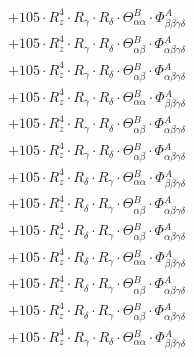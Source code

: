 \documentclass{article}
\begin{document}
\begin{subequations}
\begin{gather}
\begin{array}{c}
 \\[0.2em] 		 + 105 \cdot R_{z}^{4} \cdot R_{\gamma{}} \cdot R_{\delta{}} \cdot \Theta{}^{B}_{\alpha{}\alpha{}} \cdot \Phi{}^{A}_{\beta{}\beta{}\gamma{}\delta{}} 
 \\[0.2em] 		 + 105 \cdot R_{z}^{4} \cdot R_{\gamma{}} \cdot R_{\delta{}} \cdot \Theta{}^{B}_{\alpha{}\beta{}} \cdot \Phi{}^{A}_{\alpha{}\beta{}\gamma{}\delta{}} 
 \\[0.2em] 		 + 105 \cdot R_{z}^{4} \cdot R_{\gamma{}} \cdot R_{\delta{}} \cdot \Theta{}^{B}_{\alpha{}\beta{}} \cdot \Phi{}^{A}_{\alpha{}\beta{}\gamma{}\delta{}} 
 \\[0.2em] 		 + 105 \cdot R_{z}^{4} \cdot R_{\gamma{}} \cdot R_{\delta{}} \cdot \Theta{}^{B}_{\alpha{}\alpha{}} \cdot \Phi{}^{A}_{\beta{}\beta{}\gamma{}\delta{}} 
 \\[0.2em] 		 + 105 \cdot R_{z}^{4} \cdot R_{\gamma{}} \cdot R_{\delta{}} \cdot \Theta{}^{B}_{\alpha{}\beta{}} \cdot \Phi{}^{A}_{\alpha{}\beta{}\gamma{}\delta{}} 
 \\[0.2em] 		 + 105 \cdot R_{z}^{4} \cdot R_{\gamma{}} \cdot R_{\delta{}} \cdot \Theta{}^{B}_{\alpha{}\beta{}} \cdot \Phi{}^{A}_{\alpha{}\beta{}\gamma{}\delta{}} 
 \\[0.2em] 		 + 105 \cdot R_{z}^{4} \cdot R_{\delta{}} \cdot R_{\gamma{}} \cdot \Theta{}^{B}_{\alpha{}\alpha{}} \cdot \Phi{}^{A}_{\beta{}\beta{}\gamma{}\delta{}} 
 \\[0.2em] 		 + 105 \cdot R_{z}^{4} \cdot R_{\delta{}} \cdot R_{\gamma{}} \cdot \Theta{}^{B}_{\alpha{}\beta{}} \cdot \Phi{}^{A}_{\alpha{}\beta{}\gamma{}\delta{}} 
 \\[0.2em] 		 + 105 \cdot R_{z}^{4} \cdot R_{\delta{}} \cdot R_{\gamma{}} \cdot \Theta{}^{B}_{\alpha{}\beta{}} \cdot \Phi{}^{A}_{\alpha{}\beta{}\gamma{}\delta{}} 
 \\[0.2em] 		 + 105 \cdot R_{z}^{4} \cdot R_{\delta{}} \cdot R_{\gamma{}} \cdot \Theta{}^{B}_{\alpha{}\alpha{}} \cdot \Phi{}^{A}_{\beta{}\beta{}\gamma{}\delta{}} 
 \\[0.2em] 		 + 105 \cdot R_{z}^{4} \cdot R_{\delta{}} \cdot R_{\gamma{}} \cdot \Theta{}^{B}_{\alpha{}\beta{}} \cdot \Phi{}^{A}_{\alpha{}\beta{}\gamma{}\delta{}} 
 \\[0.2em] 		 + 105 \cdot R_{z}^{4} \cdot R_{\delta{}} \cdot R_{\gamma{}} \cdot \Theta{}^{B}_{\alpha{}\beta{}} \cdot \Phi{}^{A}_{\alpha{}\beta{}\gamma{}\delta{}} 
 \\[0.2em] 		 + 105 \cdot R_{z}^{4} \cdot R_{\gamma{}} \cdot R_{\delta{}} \cdot \Theta{}^{B}_{\alpha{}\alpha{}} \cdot \Phi{}^{A}_{\beta{}\beta{}\gamma{}\delta{}} 

\end{array}
\end{gather}
\end{subequations}
\end{document}
